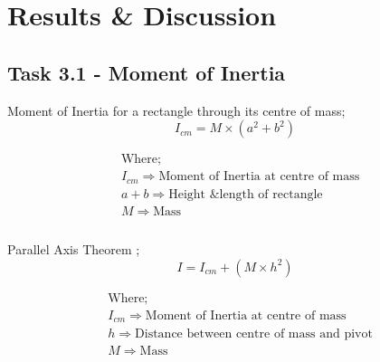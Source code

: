 \documentclass[12pt]{article}
\begin{document}

\section{Results \& Discussion}
\label{Results Discussion Section}


\subsection{Task 3.1 - Moment of Inertia}
\label{Task 3.1 - Moment of Inertia SubSection}

Moment of Inertia for a rectangle through its centre of mass; \\

\begin{equation} \label{Moment of Inertia for a rectangle}
{I_{cm} = M \times (a^2 + b^2)}
\end{equation}

\begin{equation*}
\begin{split}
&\text{Where;} \\
&I_{cm} \Rightarrow \text{Moment of Inertia at centre of mass} \\
&a+b \Rightarrow \text{Height \& length of rectangle} \\
&M \Rightarrow \text{Mass} \\
\end{split}
\end{equation*} \\

Parallel Axis Theorem ; \\

\begin{equation} \label{Parallel Axis Theorem}
{I = I_{cm} + (M \times h^2)}
\end{equation}

\begin{equation*}
\begin{split}
&\text{Where;} \\
&I_{cm} \Rightarrow \text{Moment of Inertia at centre of mass} \\
&h \Rightarrow \text{Distance between centre of mass and pivot} \\
&M \Rightarrow \text{Mass} \\
\end{split}
\end{equation*} \\
\end{document}

